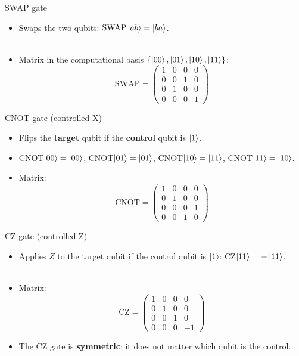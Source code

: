 \documentclass[aspectratio=169,12pt]{beamer}
\begin{document}
\begin{frame}{SWAP gate}
  \begin{itemize}[<+->]
    \setlength{\itemsep}{0.55em}
    \item Swaps the two qubits: $\text{SWAP}\ket{ab} = \ket{ba}$.\\~\\
    \item Matrix in the computational basis $\{\ket{00},\ket{01},\ket{10},\ket{11}\}$:
    $$\text{SWAP} = \begin{pmatrix} 1&0&0&0 \\ 0&0&1&0 \\ 0&1&0&0 \\ 0&0&0&1 \end{pmatrix}$$
  \end{itemize}
\end{frame}

\begin{frame}{CNOT gate (controlled-X)}
    \begin{itemize}[<+->]
      \setlength{\itemsep}{0.55em}
      \item Flips the \textbf{target} qubit if the \textbf{control} qubit is $\ket{1}$.
      \item CNOT$\ket{00}=\ket{00}$, CNOT$\ket{01}=\ket{01}$,
       CNOT$\ket{10}=\ket{11}$, CNOT$\ket{11}=\ket{10}$.
      \item Matrix:
      $$\text{CNOT} = \begin{pmatrix} 1&0&0&0 \\ 0&1&0&0 \\ 0&0&0&1 \\ 0&0&1&0 \end{pmatrix}$$
    \end{itemize}
\end{frame}

\begin{frame}{CZ gate (controlled-Z)}
  \begin{itemize}[<+->]
    \setlength{\itemsep}{0.55em}
    \item Applies $Z$ to the target qubit if the control qubit is $\ket{1}$:
     CZ$\ket{11} = -\ket{11}$.\\~\\
    \item Matrix:
    $$\text{CZ} = \begin{pmatrix} 1&0&0&0 \\ 0&1&0&0 \\ 0&0&1&0 \\ 0&0&0&-1 \end{pmatrix}$$
    \item The CZ gate is \textbf{symmetric}: it does not matter which qubit is the control.
  \end{itemize}
\end{frame}
\end{document}
